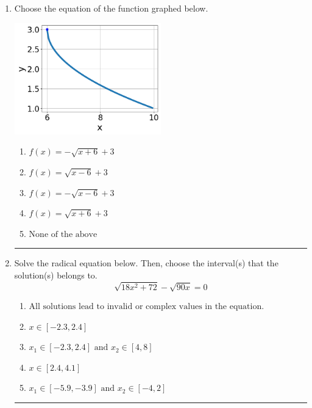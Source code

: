 \documentclass[14pt]{extbook}
\newcommand{\litem}[1]{\item#1\hspace*{-1cm}\rule{\textwidth}{0.4pt}}
\begin{document}
\begin{enumerate}
{\begin{enumerate}[label=\Alph*.]
\end{enumerate} }
\litem{
Choose the equation of the function graphed below.
\begin{center}
    \includegraphics[width=0.5\textwidth]{../Figures/radicalGraphToEquationCopyA.png}
\end{center}
\begin{enumerate}[label=\Alph*.]
\item \( f(x) = - \sqrt{x + 6} + 3 \)
\item \( f(x) = \sqrt{x - 6} + 3 \)
\item \( f(x) = - \sqrt{x - 6} + 3 \)
\item \( f(x) = \sqrt{x + 6} + 3 \)
\item \( \text{None of the above} \)

\end{enumerate} }
\litem{
Solve the radical equation below. Then, choose the interval(s) that the solution(s) belongs to.\[ \sqrt{18 x^2 + 72} - \sqrt{90 x} = 0 \]\begin{enumerate}[label=\Alph*.]
\item \( \text{All solutions lead to invalid or complex values in the equation.} \)
\item \( x \in [-2.3,2.4] \)
\item \( x_1 \in [-2.3, 2.4] \text{ and } x_2 \in [4,8] \)
\item \( x \in [2.4,4.1] \)
\item \( x_1 \in [-5.9, -3.9] \text{ and } x_2 \in [-4,2] \)


\end{enumerate}}
\end{enumerate}
\end{document}
